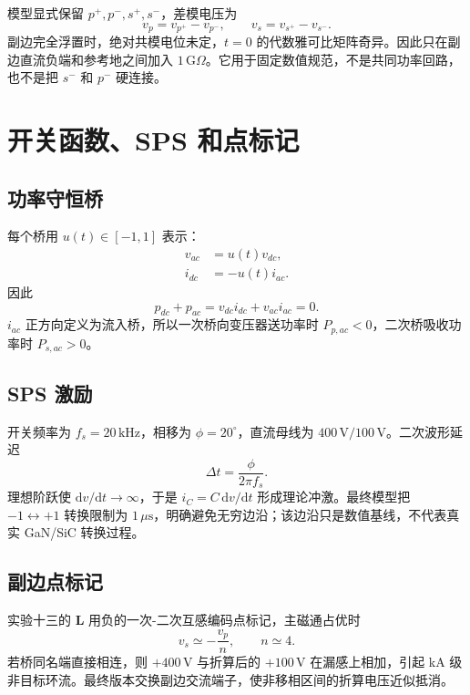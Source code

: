 \documentclass[11pt,a4paper]{ctexart}
\begin{document}
模型显式保留 $p^+,p^-,s^+,s^-$，差模电压为
\[
v_p=v_{p^+}-v_{p^-},\qquad v_s=v_{s^+}-v_{s^-}.
\]
副边完全浮置时，绝对共模电位未定，$t=0$ 的代数雅可比矩阵奇异。因此只在副边直流负端和参考地之间加入 $1\,\mathrm{G}\Omega$。它用于固定数值规范，不是共同功率回路，也不是把 $s^-$ 和 $p^-$ 硬连接。

\section{开关函数、SPS 和点标记}
\subsection{功率守恒桥}
每个桥用 $u(t)\in[-1,1]$ 表示：
\begin{align}
v_{ac}&=u(t)v_{dc},\\
i_{dc}&=-u(t)i_{ac}.
\end{align}
因此
\begin{equation}
p_{dc}+p_{ac}=v_{dc}i_{dc}+v_{ac}i_{ac}=0.
\label{eq:power}
\end{equation}
$i_{ac}$ 正方向定义为流入桥，所以一次桥向变压器送功率时 $P_{p,ac}<0$，二次桥吸收功率时 $P_{s,ac}>0$。

\subsection{SPS 激励}
开关频率为 $f_s=20\,\mathrm{kHz}$，相移为 $\phi=20^\circ$，直流母线为 $400\,\mathrm{V}/100\,\mathrm{V}$。二次波形延迟
\begin{equation}
\Delta t=\frac{\phi}{2\pi f_s}.
\end{equation}
理想阶跃使 $\mathrm dv/\mathrm dt\to\infty$，于是 $i_C=C\,\mathrm dv/\mathrm dt$ 形成理论冲激。最终模型把 $-1\leftrightarrow+1$ 转换限制为 $1\,\mu\mathrm{s}$，明确避免无穷边沿；该边沿只是数值基线，不代表真实 GaN/SiC 转换过程。

\subsection{副边点标记}
实验十三的 $\bm L$ 用负的一次-二次互感编码点标记，主磁通占优时
\[
v_s\simeq-\frac{v_p}{n},\qquad n\simeq4.
\]
若桥同名端直接相连，则 $+400\,\mathrm{V}$ 与折算后的 $+100\,\mathrm{V}$ 在漏感上相加，引起 kA 级非目标环流。最终版本交换副边交流端子，使非移相区间的折算电压近似抵消。
\end{document}
